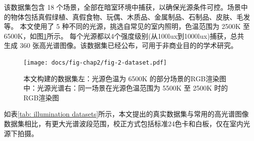 \documentclass[
    type = master, %
    degree = academic,        %
    decl-page,  %
  ]{njuthesis}
\begin{document}
该数据集包含 18 个场景，全部在暗室环境中捕获，以确保光源条件可控。场景中的物体包括真假绿植、真假食物、玩偶、木质品、金属制品、石制品、皮肤、毛发等。 本文使用了 5 种不同的光源，挑选自常见的室内照明，色温范围为 2500K 至 6500K，如图\ref{fig:dataset}所示。 每个光源都以4个强度级别(从100lux到1000lux)捕获，总共生成 360 张高光谱图像。该数据集已经公布，可用于非商业目的的学术研究。

\begin{figure}[h]

    \texttt{[image: docs/fig-chap2/fig-2-dataset.pdf]} %
  \caption{本文构建的数据集\quad 左：光源色温为 6500K 的部分场景的RGB渲染图\quad 中：光源光谱\quad 右：同一场景在光源色温范围为 5500K 至 2500K 时的RGB渲染图}
  \label{fig:dataset}
\end{figure}


如表\ref{tab: illumination datasets}所示，本文提出的真实数据集与常用的高光谱图像数据集相比，有更大光谱波段范围，校正方式包括标准24色卡和白板，仅在室内光源下拍摄。
\end{document}
